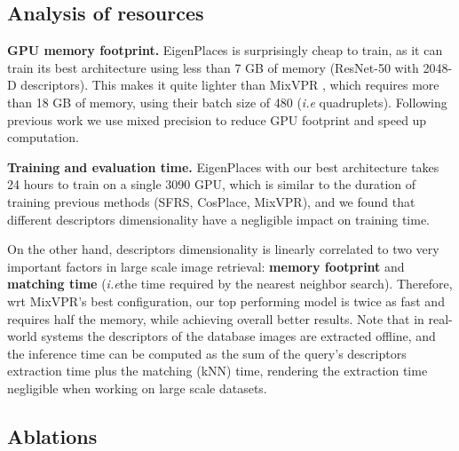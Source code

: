 \documentclass[10pt,twocolumn,letterpaper]{article}
\def\ie{\emph{i.e}\onedot}
\newcommand{\myparagraph}[1]{\vspace{4pt}\noindent\textbf{#1}}
\begin{document}
\subsection{Analysis of resources}

\myparagraph{GPU memory footprint.}
EigenPlaces is surprisingly cheap to train, as it can train its best architecture using less than 7 GB of memory (ResNet-50 with 2048-D descriptors).
This makes it quite lighter than MixVPR \cite{Alibey_2023_mixvpr}, which requires more than 18 GB of memory, using their batch size of 480 (\ie 120 quadruplets).
Following previous work \cite{Alibey_2022_gsvcities, Alibey_2023_mixvpr} we use mixed precision to reduce GPU footprint and speed up computation.

\myparagraph{Training and evaluation time.}
EigenPlaces with our best architecture takes 24 hours to train on a single 3090 GPU, which is similar to the duration of training previous methods (SFRS, CosPlace, MixVPR), and we found that different descriptors dimensionality have a negligible impact on training time.

On the other hand, descriptors dimensionality is linearly correlated to two very important factors in large scale image retrieval: \textbf{memory footprint} and \textbf{matching time} (\ie the time required by the nearest neighbor search).
Therefore, wrt MixVPR's best configuration, our top performing model is twice as fast and requires half the memory, while achieving overall better results.
Note that in real-world systems the descriptors of the database images are extracted offline, and the inference time can be computed as the sum of the query's descriptors extraction time plus the matching (kNN) time, rendering the extraction time negligible when working on large scale datasets.




\subsection{Ablations}
\label{sec:ablations}
\end{document}
